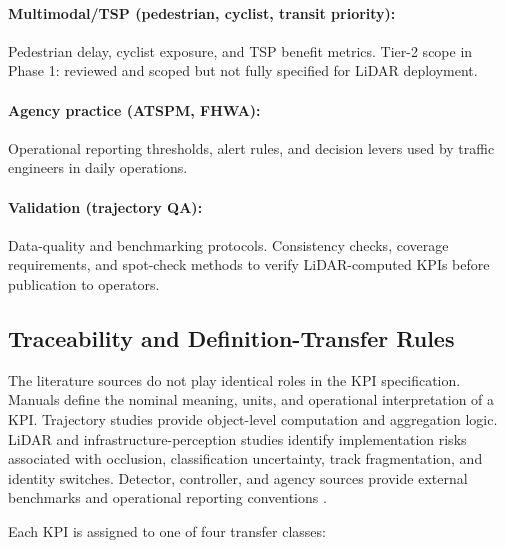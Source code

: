 \documentclass[11pt]{article}
\begin{document}
\paragraph{Multimodal/TSP (pedestrian, cyclist, transit priority):} Pedestrian delay, cyclist exposure, and TSP benefit metrics. Tier-2 scope in Phase 1: reviewed and scoped but not fully specified for LiDAR deployment.

\paragraph{Agency practice (ATSPM, FHWA):} Operational reporting thresholds, alert rules, and decision levers used by traffic engineers in daily operations.

\paragraph{Validation (trajectory QA):} Data-quality and benchmarking protocols. Consistency checks, coverage requirements, and spot-check methods to verify LiDAR-computed KPIs before publication to operators.

\subsection{Traceability and Definition-Transfer Rules}

The literature sources do not play identical roles in the KPI specification.
Manuals define the nominal meaning, units, and operational interpretation of a
KPI. Trajectory studies provide object-level computation and aggregation
logic. LiDAR and infrastructure-perception studies identify implementation
risks associated with occlusion, classification uncertainty, track
fragmentation, and identity switches. Detector, controller, and agency sources
provide external benchmarks and operational reporting conventions
\cite{nasem2022hcm,nasem2015stm,fhwa2020atspm,fhwa2006detectors,
kloeker2020multilidar,zimmer2023infradet3d}.

Each KPI is assigned to one of four transfer classes:
\end{document}
